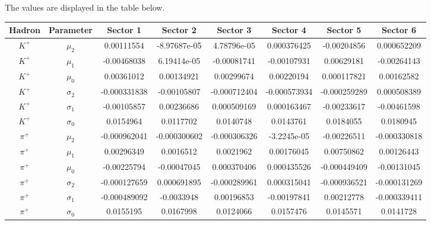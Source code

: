 The values are displayed in the table below. 

\begin{landscape}
  \begin{table}
  \begin{tabular}{c|c|c|c|c|c|c|c}
    Hadron & Parameter & Sector 1 & Sector 2 & Sector 3 & Sector 4 & Sector 5 & Sector 6 \\
    \hline 
      $K^+$ & $\mu_2$ & 0.00111554 & -8.97687e-05 &        4.78796e-05 &        0.000376425 &        -0.00204856 &        0.000652209 \\
       $K^+$ & $\mu_1$ & -0.00468038 & 6.19414e-05 &        -0.00081741 &       -0.00107931 &         0.00629181 &        -0.00264143 \\
       $K^+$ & $\mu_0$ & 0.00361012 &         0.00134921 &         0.00299674 &         0.00220194 &        0.000117821 &         0.00162582 \\
    $K^+$ & $\sigma_2$ & -0.000331838 &        -0.00105807 &       -0.000712404 &       -0.000573934 &       -0.000259289 &        0.000508389 \\
    $K^+$ & $\sigma_1$ & -0.00105857 &         0.00236686 &        0.000509169 &        0.000163467 &        -0.00233617 &        -0.00461598 \\
    $K^+$ & $\sigma_0$ & 0.0154964 &           0.0117702 &          0.0140748 &          0.0143761 &          0.0184055 &         0.0180945 \\
      $\pi^+$ & $\mu_2$ & -0.000962041 &       -0.000300602 &       -0.000306326 &        -3.2245e-05 &        -0.00226511 &       -0.000330818 \\
      $\pi^+$ & $\mu_1$ & 0.00296349 &          0.0016512 &          0.0021962 &         0.00176045 &         0.00750862 &         0.00126443 \\
      $\pi^+$ & $\mu_0$ & -0.00225794 &        -0.00047045 &        0.000370406 &        0.000435526 &       -0.000449409 &        -0.00131045 \\
   $\pi^+$ & $\sigma_2$ & -0.000127659 &        0.000691895 &       -0.000289961 &        0.000315041 &       -0.000936521 &       -0.000131269 \\
   $\pi^+$ & $\sigma_1$ & -0.000489092 &         -0.0033948 &         0.00196853 &       -0.00197841 &         0.00212778 &       -0.000339411 \\
   $\pi^+$ & $\sigma_0$ & 0.0155195 &           0.0167998 &          0.0124066 &          0.0157476 &          0.0145571 &         0.0141728 \\

\end{tabular}
\end{table}
\end{landscape}
